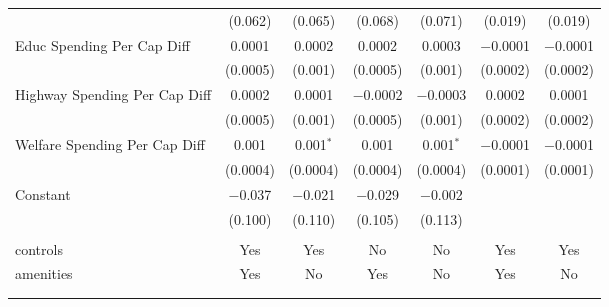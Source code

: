 \begin{table}[!htbp]
\begin{tabular}{@{\extracolsep{5pt}}lcccccc}
  & (0.062) & (0.065) & (0.068) & (0.071) & (0.019) & (0.019) \\ 
  Educ Spending Per Cap Diff & 0.0001 & 0.0002 & 0.0002 & 0.0003 & $-$0.0001 & $-$0.0001 \\ 
  & (0.0005) & (0.001) & (0.0005) & (0.001) & (0.0002) & (0.0002) \\ 
  Highway Spending Per Cap Diff & 0.0002 & 0.0001 & $-$0.0002 & $-$0.0003 & 0.0002 & 0.0001 \\ 
  & (0.0005) & (0.001) & (0.0005) & (0.001) & (0.0002) & (0.0002) \\ 
  Welfare Spending Per Cap Diff & 0.001 & 0.001$^{*}$ & 0.001 & 0.001$^{*}$ & $-$0.0001 & $-$0.0001 \\ 
  & (0.0004) & (0.0004) & (0.0004) & (0.0004) & (0.0001) & (0.0001) \\ 
  Constant & $-$0.037 & $-$0.021 & $-$0.029 & $-$0.002 &  &  \\ 
  & (0.100) & (0.110) & (0.105) & (0.113) &  &  \\ 
 \hline \\[-1.8ex] 
controls & Yes & Yes & No & No & Yes & Yes \\ 
amenities & Yes & No & Yes & No & Yes & No \\ 
\hline \\[-1.8ex] 
\hline 
\hline \\[-1.8ex] 
\end{tabular} 
\end{table} 
